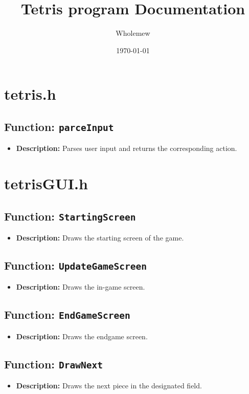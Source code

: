 \documentclass{article}
\title{Tetris program Documentation}
\author{Wholemew}
\date{\today}
\begin{document}
\maketitle
\tableofcontents

\section{tetris.h}
\subsection{Function: \texttt{parceInput}}
\begin{itemize}
    \item \textbf{Description:} Parses user input and returns the corresponding action.
\end{itemize}

\section{tetrisGUI.h}
\subsection{Function: \texttt{StartingScreen}}
\begin{itemize}
    \item \textbf{Description:} Draws the starting screen of the game.
\end{itemize}

\subsection{Function: \texttt{UpdateGameScreen}}
\begin{itemize}
    \item \textbf{Description:} Draws the in-game screen.
\end{itemize}

\subsection{Function: \texttt{EndGameScreen}}
\begin{itemize}
    \item \textbf{Description:} Draws the endgame screen.
\end{itemize}

\subsection{Function: \texttt{DrawNext}}
\begin{itemize}
    \item \textbf{Description:} Draws the next piece in the designated field.
\end{itemize}
\end{document}
